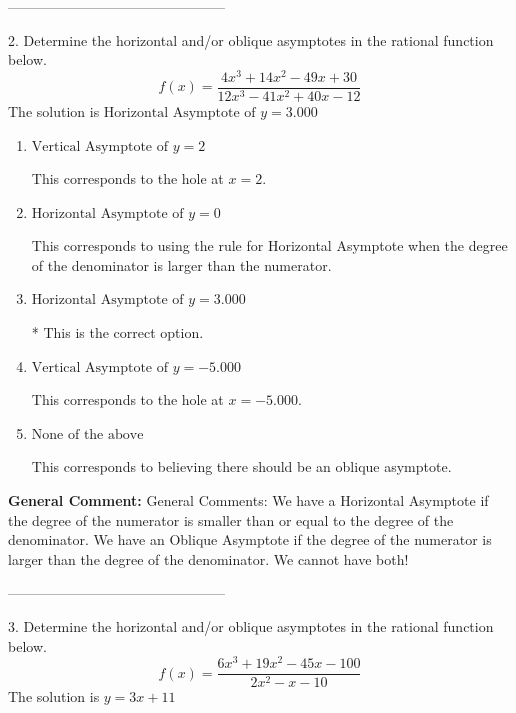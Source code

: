 \documentclass{extbook}[14pt]
\begin{document}
-----------------------------------------------

2. Determine the horizontal and/or oblique asymptotes in the rational function below.
\[ f(x) = \frac{4x^{3} +14 x^{2} -49 x + 30}{12x^{3} -41 x^{2} +40 x -12} \] 
The solution is $ \text{Horizontal Asymptote of } y = 3.000  $ 

\begin{enumerate}[label=\Alph*.] 
\item $ \text{Vertical Asymptote of } y = 2  $ 

 This corresponds to the hole at $x = 2$. 
\item $ \text{Horizontal Asymptote of } y = 0  $ 

 This corresponds to using the rule for Horizontal Asymptote when the degree of the denominator is larger than the numerator. 
\item $ \text{Horizontal Asymptote of } y = 3.000  $ 

 * This is the correct option. 
\item $ \text{Vertical Asymptote of } y = -5.000  $ 

 This corresponds to the hole at $x = -5.000$. 
\item $ \text{None of the above} $ 

 This corresponds to believing there should be an oblique asymptote. 
\end{enumerate} 
 
\textbf{General Comment:} General Comments: We have a Horizontal Asymptote if the degree of the numerator is smaller than or equal to the degree of the denominator. We have an Oblique Asymptote if the degree of the numerator is larger than the degree of the denominator. We cannot have both! 

-----------------------------------------------

3. Determine the horizontal and/or oblique asymptotes in the rational function below.
\[ f(x) = \frac{6x^{3} +19 x^{2} -45 x -100}{2x^{2} -x -10} \] 
The solution is $ y = 3x + 11 $ 
\end{document}
